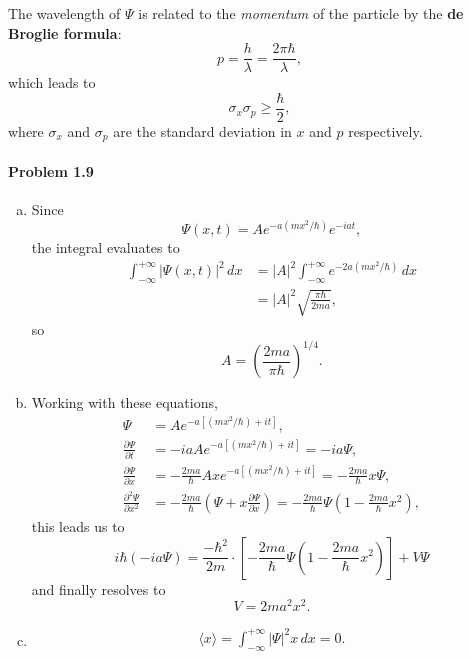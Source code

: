 \documentclass{article}
\begin{document}
The wavelength of $\Psi$ is related to the \emph{momentum} of the particle by
the \textbf{de Broglie formula}:
\begin{equation} \label{eq:de-brog}
  p = \frac{h}{\lambda} = \frac{2\pi\hbar}{\lambda},
\end{equation}
which leads to
\begin{equation} \label{eq:unc-prin}
  \boxed{
    \sigma_x \sigma_p \geq \frac{\hbar}{2},
  }
\end{equation}
where $\sigma_x$ and $\sigma_p$ are the standard deviation in $x$ and $p$
respectively.

\paragraph{Problem 1.9}
\begin{enumerate}[(a)]
  \item Since \[
      \Psi(x, t) = Ae^{-a(mx^2/\hbar)}e^{-iat},
    \] the integral evaluates to
    \begin{align*}
      \int_{-\infty}^{+\infty} |\Psi(x, t)|^2 \,dx
      &= |A|^2\int_{-\infty}^{+\infty} e^{-2a(mx^2/\hbar)} \,dx \\
      &= |A|^2\sqrt{\frac{\pi\hbar}{2ma}},
    \end{align*}
    so \[
      A = \left(\frac{2ma}{\pi\hbar}\right)^{1/4}.
    \]
  \item Working with these equations,
    \begin{align*}
      \Psi
      &= Ae^{-a[(mx^2/\hbar) + it]}, \\
      \frac{\partial \Psi}{\partial t}
      &= -iaA e^{-a[(mx^2/\hbar) + it]} = -ia\Psi, \\
      \frac{\partial \Psi}{\partial x}
      &= -\frac{2ma}{\hbar} Ax e^{-a[(mx^2/\hbar) + it]}
      = -\frac{2ma}{\hbar} x \Psi, \\
      \frac{\partial^2 \Psi}{\partial x^2}
      &= -\frac{2ma}{\hbar}\left(
        \Psi + x \frac{\partial \Psi}{\partial x}
      \right)
      = -\frac{2ma}{\hbar}\Psi\left(1 - \frac{2ma}{\hbar} x^2\right),
    \end{align*}
    this leads us to \[
      i\hbar(-ia\Psi) = \frac{-\hbar^2}{2m} \cdot \left[
        -\frac{2ma}{\hbar}\Psi\left(1 - \frac{2ma}{\hbar} x^2\right)
      \right] + V\Psi
    \] and finally resolves to \[
      V = 2ma^2x^2.
    \]
  \item
    \begin{gather*}
      \langle x \rangle = \int_{-\infty}^{+\infty} |\Psi|^2x \,dx = 0. \\

\end{gather*}
\end{enumerate}
\end{document}
